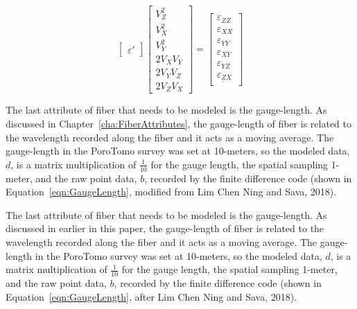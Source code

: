 \begin{equation}
  \begin{bmatrix}
    \varepsilon'
  \end{bmatrix}
\begin{bmatrix}
  V_Z^2 \\ V_X^2 \\ V_Y^2 \\ 2V_XV_Y \\ 2V_YV_Z \\2V_ZV_X
\end{bmatrix}
=
\begin{bmatrix}
  \varepsilon_{ZZ} \\
  \varepsilon_{XX} \\
  \varepsilon_{YY} \\
  \varepsilon_{XY} \\
  \varepsilon_{YZ} \\
  \varepsilon_{ZX} \\
\end{bmatrix}
\label{eqn:StrainMultiComponent}
\end{equation}

The last attribute of fiber that needs to be modeled is the gauge-length. As discussed in Chapter~\ref{cha:FiberAttributes}, the gauge-length of fiber is related to the wavelength recorded along the fiber and it acts as a moving average. The gauge-length in the PoroTomo survey was set at 10-meters, so the modeled data, $d$, is a matrix multiplication of $\frac{1}{10}$ for the gauge length, the spatial sampling 1-meter, and the raw point data, $b$, recorded by the finite difference code (shown in Equation~\ref{eqn:GaugeLength}, modified from Lim Chen Ning and Sava, 2018).

The last attribute of fiber that needs to be modeled is the gauge-length. As discussed in earlier in this paper, the gauge-length of fiber is related to the wavelength recorded along the fiber and it acts as a moving average. The gauge-length in the PoroTomo survey was set at 10-meters, so the modeled data, $d$, is a matrix multiplication of $\frac{1}{10}$ for the gauge length, the spatial sampling 1-meter, and the raw point data, $b$, recorded by the finite difference code (shown in Equation~\ref{eqn:GaugeLength}, after Lim Chen Ning and Sava, 2018).

